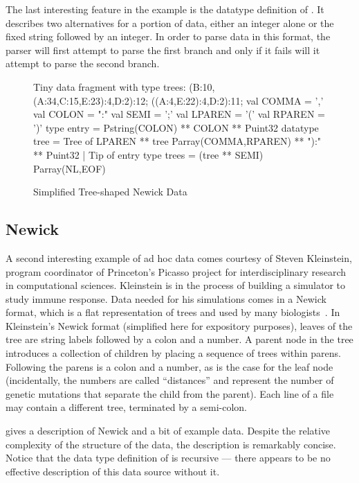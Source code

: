 The last interesting feature in the \dibbler{} example is the
datatype definition of .  It describes
two alternatives for a portion of data, either an integer alone
or the fixed string  followed by an integer.
In order to parse data in this format, the parser will
first attempt to parse the first branch and only if it
fails will it attempt to parse the second branch.

\begin{figure}
\begin{code}
{\rm Tiny data fragment with type trees: }
\mbox{}
(B:10,(A:34,C:15,E:23):4,D:2):12;
((A:4,E:22):4,D:2):11;
\mbox{}
val COMMA  = ','
val COLON  = ":"
val SEMI   = ';'
val LPAREN = '('
val RPAREN = ')'
\mbox{}
type entry = Pstring(COLON) ** COLON ** Puint32
\mbox{}
datatype tree =
    Tree of LPAREN ** tree Parray(COMMA,RPAREN) ** "):" ** Puint32
  | Tip of entry
\mbox{}
type trees = (tree ** SEMI) Parray(NL,EOF)
\end{code}
\caption{Simplified Tree-shaped Newick Data}
\label{fig:newick}
\end{figure}

\subsection{Newick}

A second interesting example of ad hoc data comes courtesy of Steven
Kleinstein, program coordinator of Princeton's Picasso project for
interdisciplinary research in computational sciences.  Kleinstein is
in the process of building a simulator to study immune response.  Data
needed for his simulations comes in a Newick format, which is a flat
representation of trees and used by many biologists~\cite{newick}.  In
Kleinstein's Newick format (simplified here for expository purposes),
leaves of the tree are string labels followed by a colon and a number.
A parent node in the tree introduces a collection of children by
placing a sequence of trees within parens.  Following the parens is a
colon and a number, as is the case for the leaf node (incidentally,
the numbers are called ``distances'' and represent the number of
genetic mutations that separate the child from the parent).  Each line
of a file may contain a different tree, terminated by a semi-colon.

 gives a description of Newick and a bit of example
data.  Despite the relative complexity of the structure of the data,
the description is remarkably concise.  Notice that the data type
definition of  is recursive --- there appears to be no
effective description of this data source without it.

